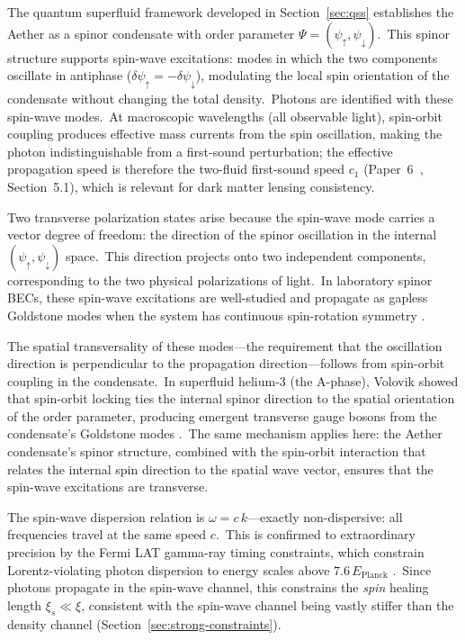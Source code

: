 ﻿\documentclass[12pt,letterpaper]{article}
\begin{document}
The quantum superfluid framework developed in Section~\ref{sec:qss} establishes
the Aether as a spinor condensate with order parameter
$\Psi = (\psi_\uparrow, \psi_\downarrow)$.\ This spinor structure supports
spin-wave excitations: modes in which the two components oscillate in
antiphase ($\delta\psi_\uparrow = -\delta\psi_\downarrow$), modulating the
local spin orientation of the condensate without changing the total density.\
Photons are identified with these spin-wave modes.\ At macroscopic wavelengths
(all observable light), spin-orbit coupling produces effective mass currents
from the spin oscillation, making the photon indistinguishable from a
first-sound perturbation; the effective propagation speed is therefore the
two-fluid first-sound speed $c_1$ (Paper~6~\cite{otto-cosmology},
Section~5.1), which is relevant for dark matter lensing consistency.

Two transverse polarization states arise because the spin-wave mode carries a
vector degree of freedom: the direction of the spinor oscillation in the internal
$(\psi_\uparrow, \psi_\downarrow)$ space.\ This direction projects onto two
independent components, corresponding to the two physical polarizations of light.\
In laboratory spinor BECs, these spin-wave excitations are well-studied and
propagate as gapless Goldstone modes when the system has continuous spin-rotation
symmetry \cite{stamper-kurn2013}.

The spatial transversality of these modes---the requirement that the oscillation
direction is perpendicular to the propagation direction---follows from spin-orbit
coupling in the condensate.\ In superfluid helium-3 (the A-phase), Volovik showed
that spin-orbit locking ties the internal spinor direction to the spatial orientation
of the order parameter, producing emergent transverse gauge bosons from the condensate's
Goldstone modes \cite{volovik2003}.\ The same mechanism applies here: the Aether
condensate's spinor structure, combined with the spin-orbit interaction that relates
the internal spin direction to the spatial wave vector, ensures that the spin-wave
excitations are transverse.

The spin-wave dispersion relation is $\omega = c\,k$---exactly non-dispersive: all
frequencies travel at the same speed $c$.\ This is confirmed to extraordinary
precision by the Fermi LAT gamma-ray timing constraints, which constrain
Lorentz-violating photon dispersion to energy scales above
$7.6\,E_{\mathrm{Planck}}$ \cite{vasileiou2013}.\ Since photons propagate in the
spin-wave channel, this constrains the \emph{spin} healing length $\xi_s \ll \xi$,
consistent with the spin-wave channel being vastly stiffer than the density channel
(Section~\ref{sec:strong-constraints}).
\end{document}
